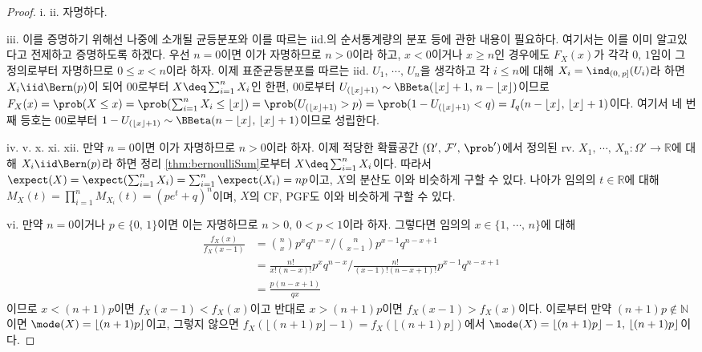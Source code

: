 \begin{proof}
    i. ii. 자명하다.

    iii. 이를 증명하기 위해선 나중에 소개될 균등분포와 이를 따르는 iid.의 순서통계량의 분포 등에 관한 내용이 필요하다. 여기서는 이를 이미 알고있다고 전제하고 증명하도록 하겠다. 우선 $n=0$이면 이가 자명하므로 $n>0$이라 하고, $x<0$이거나 $x\geq n$인 경우에도 $F_X(x)$가 각각 $0,\,1$임이 그 정의로부터 자명하므로 $0\leq x<n$이라 하자. 이제 표준균등분포를 따르는 iid. $U_1,\,\cdots,\,U_n$을 생각하고 각 $i\leq n$에 대해 $X_i=\ind_{(0,\,p]}(U_i)$라 하면 $X_i\iid\Bern(p)$이 되어 00로부터 $X\deq\sum_{i=1}^nX_i$인 한편, 00로부터 $U_{(\lfloor x\rfloor+1)}\sim\BBeta(\lfloor x\rfloor+1,\,n-\lfloor x\rfloor)$이므로 $F_X(x)=\prob(X\leq x)=\prob(\sum_{i=1}^nX_i\leq\lfloor x\rfloor)=\prob(U_{(\lfloor x\rfloor+1)}>p)=\prob(1-U_{(\lfloor x\rfloor+1)}<q)=I_q(n-\lfloor x\rfloor,\,\lfloor x\rfloor+1)$이다. 여기서 네 번째 등호는 00로부터 $1-U_{(\lfloor x\rfloor+1)}\sim\BBeta(n-\lfloor x\rfloor,\,\lfloor x\rfloor+1)$이므로 성립한다.

    iv. v. x. xi. xii. 만약 $n=0$이면 이가 자명하므로 $n>0$이라 하자. 이제 적당한 확률공간 $(\Omega',\,\mathcal{F}',\,\prob')$에서 정의된 rv. $X_1,\,\cdots,\,X_n:\Omega'\to\mathbb{R}$에 대해 $X_i\iid\Bern(p)$라 하면 정리 \ref{thm:bernoulliSum}로부터 $X\deq\sum_{i=1}^nX_i$이다. 따라서 $\expect(X)=\expect(\sum_{i=1}^nX_i)=\sum_{i=1}^n\expect(X_i)=np$이고, $X$의 분산도 이와 비슷하게 구할 수 있다. 나아가 임의의 $t\in\mathbb{R}$에 대해 $M_X(t)=\prod_{i=1}^nM_{X_i}(t)=(pe^t+q)^n$이며, $X$의 CF, PGF도 이와 비슷하게 구할 수 있다.

    vi. 만약 $n=0$이거나 $p\in\{0,\,1\}$이면 이는 자명하므로 $n>0,\,0<p<1$이라 하자. 그렇다면 임의의 $x\in\{1,\,\cdots,\,n\}$에 대해
    \begin{align*}
        \frac{f_X(x)}{f_X(x-1)}&=\binom{n}{x}p^xq^{n-x}\bigg/\binom{n}{x-1}p^{x-1}q^{n-x+1}\\
        &=\frac{n!}{x!(n-x)!}p^xq^{n-x}\bigg/\frac{n!}{(x-1)!(n-x+1)!}p^{x-1}q^{n-x+1}\\
        &=\frac{p(n-x+1)}{qx}
    \end{align*}
    이므로 $x<(n+1)p$이면 $f_X(x-1)<f_X(x)$이고 반대로 $x>(n+1)p$이면 $f_X(x-1)>f_X(x)$이다. 이로부터 만약 $(n+1)p\notin\mathbb{N}$이면 $\mode(X)=\lfloor(n+1)p\rfloor$이고, 그렇지 않으면 $f_X(\lfloor(n+1)p\rfloor-1)=f_X(\lfloor(n+1)p\rfloor)$에서 $\mode(X)=\lfloor(n+1)p\rfloor-1,\,\lfloor(n+1)p\rfloor$이다.


\end{proof}
